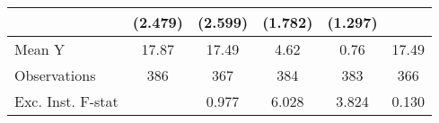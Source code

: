 {\begin{tabular}{l*{5}{c}}
            &     (2.479)         &     (2.599)         &     (1.782)         &     (1.297)         &                     \\
\midrule
Mean Y      &       17.87         &       17.49         &        4.62         &        0.76         &       17.49         \\
Observations&         386         &         367         &         384         &         383         &         366         \\
Exc. Inst. F-stat&                     &       0.977         &       6.028         &       3.824         &       0.130         \\
\bottomrule
\end{tabular}
}
